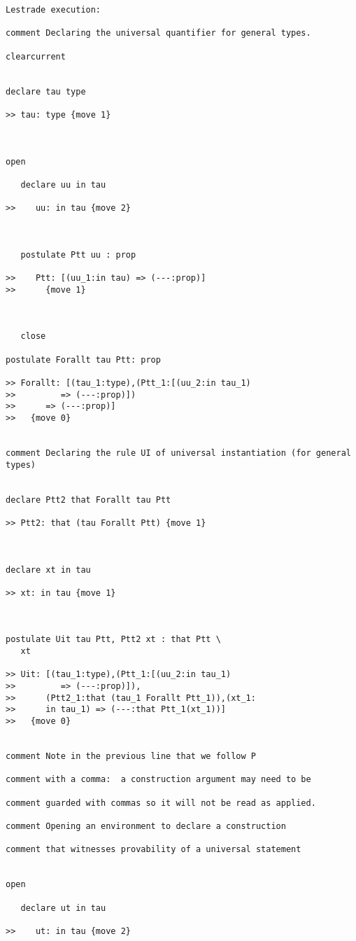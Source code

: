 \documentclass[12pt]{article}
\begin{document}
\begin{verbatim}Lestrade execution:

comment Declaring the universal quantifier for general types.

clearcurrent


declare tau type

>> tau: type {move 1}



open

   declare uu in tau

>>    uu: in tau {move 2}



   postulate Ptt uu : prop

>>    Ptt: [(uu_1:in tau) => (---:prop)]
>>      {move 1}



   close

postulate Forallt tau Ptt: prop

>> Forallt: [(tau_1:type),(Ptt_1:[(uu_2:in tau_1)
>>         => (---:prop)])
>>      => (---:prop)]
>>   {move 0}


comment Declaring the rule UI of universal instantiation (for general types)


declare Ptt2 that Forallt tau Ptt

>> Ptt2: that (tau Forallt Ptt) {move 1}



declare xt in tau

>> xt: in tau {move 1}



postulate Uit tau Ptt, Ptt2 xt : that Ptt \
   xt

>> Uit: [(tau_1:type),(Ptt_1:[(uu_2:in tau_1)
>>         => (---:prop)]),
>>      (Ptt2_1:that (tau_1 Forallt Ptt_1)),(xt_1:
>>      in tau_1) => (---:that Ptt_1(xt_1))]
>>   {move 0}


comment Note in the previous line that we follow P 

comment with a comma:  a construction argument may need to be 

comment guarded with commas so it will not be read as applied.

comment Opening an environment to declare a construction 

comment that witnesses provability of a universal statement


open

   declare ut in tau

>>    ut: in tau {move 2}




\end{verbatim}
\end{document}
